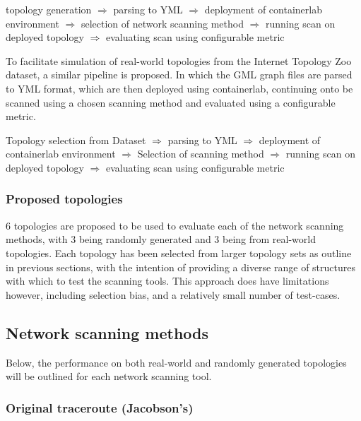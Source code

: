topology generation $\Rightarrow$ parsing to YML $\Rightarrow$ deployment of containerlab environment $\Rightarrow$ selection of network scanning method $\Rightarrow$ running scan on deployed topology $\Rightarrow$ evaluating scan using configurable metric 

To facilitate simulation of real-world topologies from the Internet Topology Zoo dataset, a similar pipeline is proposed. In which the GML graph files are parsed to YML format, which are then deployed using containerlab, continuing onto be scanned using a chosen scanning method and evaluated using a configurable metric.  

Topology selection from Dataset $\Rightarrow$ parsing to YML $\Rightarrow$ deployment of containerlab environment $\Rightarrow$ Selection of scanning method $\Rightarrow$ running scan on deployed topology $\Rightarrow$ evaluating scan using configurable metric 


\subsubsection{Proposed topologies}
6 topologies are proposed to be used to evaluate each of the network scanning methods, with 3 being randomly generated and 3 being from real-world topologies. Each topology has been selected from larger topology sets as outline in previous sections, with the intention of providing a diverse range of structures with which to test the scanning tools. This approach does have limitations however, including selection bias, and a relatively small number of test-cases. 


\subsection{Network scanning methods}
Below, the performance on both real-world and randomly generated topologies will be outlined for each network scanning tool. 

\subsubsection{Original traceroute (Jacobson's)}

